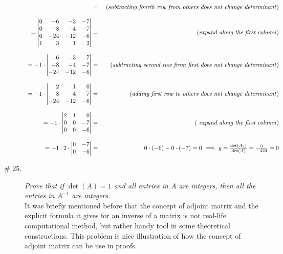 \documentclass[8pt]{article} %
\begin{document}
\begin{description}
{\[\begin{array}{rr}
			= &\mbox{ (\textit{subtracting fourth row from others does not change determinant})}\\\\
			=\begin{vmatrix*}[r]0&{-6}&-3&-7\\0&{-8}&-4&-7\\0&{-24}&-12&-6\\1&{3}&1&2\end{vmatrix*}
			= &\mbox{ (\textit{expand along the first column})}\\\\
			=-1\cdot\begin{vmatrix*}[r]{-6}&-3&-7\\{-8}&-4&-7\\{-24}&-12&-6\end{vmatrix*}
			= &\mbox{ (\textit{subtracting second row from first does not change determinant})}\\\\
			=-1\cdot\begin{vmatrix*}[r]2&1&0\\{-8}&-4&-7\\{-24}&-12&-6\end{vmatrix*}
			= &\mbox{ (\textit{adding first row to others does not change determinant})}\\\\
			=-1\cdot\begin{vmatrix*}[r]2&1&0\\0&0&-7\\0&0&-6\end{vmatrix*}
			= &\mbox{ (\textit{ expand along the first column})}\\\\
			=-1\cdot2\cdot\begin{vmatrix*}[r]0&-7\\0&-6\end{vmatrix*}
			=&0\cdot(-6)-0\cdot(-7)=0\implies y=\frac{\det(A_2)}{\det(A)}=\frac{0}{-424}=0
			\end{array}\]
		}
	\item[\# 25.]{{\it Prove that if $\det(A)=1$ and all entries in $A$ are integers, then all the entries in $A^{-1}$ are integers.}\\
		It was briefly mentioned before that the concept of adjoint matrix and the explicit formula it gives for an inverse of a matrix
		is not real-life computational method, but rather handy tool in some theoretical constructions. This problem is nice illustration
		of how the concept of adjoint matrix can be use in proofs.\\
}
\end{description}
\end{document}
